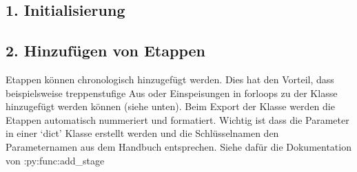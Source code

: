 \documentclass[letterpaper,10pt,english]{sphinxmanual}
\begin{document}
\subsection{1. Initialisierung}
\label{\detokenize{source/Input:initialisierung}}
\begin{sphinxVerbatim}[commandchars=\\\{\},numbers=left,firstnumber=1,stepnumber=1]
   \PYG{p}{[}\PYG{p}{]}
      \PYG{p}{[}\PYG{p}{]}
        \PYG{p}{[}\PYG{p}{]}
      
      
\end{sphinxVerbatim}


\subsection{2. Hinzufügen von Etappen}
\label{\detokenize{source/Input:hinzufugen-von-etappen}}
\sphinxAtStartPar
Etappen können chronologisch hinzugefügt werden.
Dies hat den Vorteil, dass beispielsweise treppenstufige Aus\sphinxhyphen{} oder Einspeisungen in for\sphinxhyphen{}loops zu der Klasse hinzugefügt werden können (siehe unten).
Beim Export der Klasse werden die Etappen automatisch nummeriert und formatiert.
Wichtig ist dass die Parameter in einer ‘dict’ Klasse erstellt werden und die Schlüsselnamen den Parameternamen aus dem Handbuch entsprechen.
Siehe dafür die Dokumentation von :py:func:add\_stage
\end{document}

